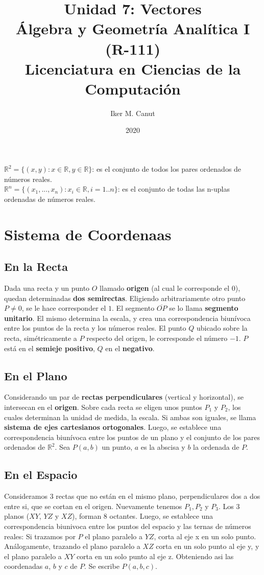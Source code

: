 \documentclass[11pt,a4paper]{article}
\author{Iker M. Canut}
\title{Unidad 7: Vectores\\\'Algebra y Geometr\'ia Anal\'itica I (R-111)\\Licenciatura en Ciencias de la Computaci\'on}
\date{2020}
\begin{document}
\maketitle
\newpage

\noindent $\mathbb{R}^2 = \{(x,y) : x\in\mathbb{R}, y\in\mathbb{R}\}$: es el conjunto de todos los pares ordenados de n\'umeros reales.\\
\noindent $\mathbb{R}^n = \{(x_1,...,x_n) : x_i\in\mathbb{R}, i=1..n\}$: es el conjunto de todas las n-uplas ordenadas de n\'umeros reales.

\section{Sistema de Coordenaas}
\subsection{En la Recta}
\noindent Dada una recta y un punto $O$ llamado \textbf{origen} (al cual le corresponde el 0), quedan determinadas \textbf{dos semirectas}. Eligiendo arbitrariamente otro punto $P\not=0$, se le hace corresponder el $1$. El segmento $\overline{OP}$ se lo llama \textbf{segmento unitario}. El mismo determina la escala, y crea una correspondencia biun\'ivoca entre los puntos de la recta y los n\'umeros reales. El punto $Q$ ubicado sobre la recta, sim\'etricamente a $P$ respecto del origen, le corresponde el n\'umero $-1$. $P$ est\'a en el \textbf{semieje positivo}, $Q$ en el \textbf{negativo}.
\subsection{En el Plano}
Considerando un par de \textbf{rectas perpendiculares} (vertical y horizontal), se intersecan en el \textbf{origen}. Sobre cada recta se eligen unos puntos $P_1$ y $P_2$, los cuales determinan la unidad de medida, la escala. Si ambas son iguales, se llama \textbf{sistema de ejes cartesianos ortogonales}. Luego, se establece una correspondencia biunívoca entre los puntos de un plano y el conjunto de los pares ordenados de $\mathbb{R}^2$. Sea $P(a,b)$ un punto, $a$ es la abscisa y $b$ la ordenada de $P$.
\subsection{En el Espacio}
Consideramos 3 rectas que no est\'an en el mismo plano, perpendiculares dos a dos entre si, que se cortan en el origen. Nuevamente tenemos $P_1, P_2$ y $P_3$. Los 3 planos ($XY$, $YZ$ y $XZ$), forman 8 octantes. Luego, se establece una correspondencia biunivoca entre los puntos del espacio y las ternas de n\'umeros reales: Si trazamos por $P$ el plano paralelo a $YZ$, corta al eje x en un solo punto. An\'alogamente, trazando el plano paralelo a $XZ$ corta en un solo punto al eje y, y el plano paralelo a $XY$ corta en un solo punto al eje z. Obteniendo asi las coordenadas $a$, $b$ y $c$ de $P$. Se escribe $P(a,b,c)$.
\end{document}
